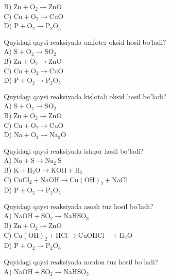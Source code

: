 B) $\mathrm{Zn}+\mathrm{O}_{2} \rightarrow \mathrm{ZnO}$\\
C) $\mathrm{Cu}+\mathrm{O}_{2} \rightarrow \mathrm{CuO}$\\
D) $\mathrm{P}+\mathrm{O}_{2} \rightarrow \mathrm{P}_{2} \mathrm{O}_{5}$
  \item Quyidagi qaysi reaksiyada amfoter oksid hosil bo'ladi?\\
A) $\mathrm{S}+\mathrm{O}_{2} \rightarrow \mathrm{SO}_{2}$\\
B) $\mathrm{Zn}+\mathrm{O}_{2} \rightarrow \mathrm{ZnO}$\\
C) $\mathrm{Cu}+\mathrm{O}_{2} \rightarrow \mathrm{CuO}$\\
D) $\mathrm{P}+\mathrm{O}_{2} \rightarrow \mathrm{P}_{2} \mathrm{O}_{5}$
  \item Quyidagi qaysi reaksiyada kislotali oksid hosil bo'ladi?\\
A) $\mathrm{S}+\mathrm{O}_{2} \rightarrow \mathrm{SO}_{2}$\\
B) $\mathrm{Zn}+\mathrm{O}_{2} \rightarrow \mathrm{ZnO}$\\
C) $\mathrm{Cu}+\mathrm{O}_{2} \rightarrow \mathrm{CuO}$\\
D) $\mathrm{Na}+\mathrm{O}_{2} \rightarrow \mathrm{Na}_{2} \mathrm{O}$
  \item Quyidagi qaysi reaksiyada ishqor hosil bo'ladi?\\
A) $\mathrm{Na}+\mathrm{S} \rightarrow \mathrm{Na}_{2} \mathrm{~S}$\\
B) $\mathrm{K}+\mathrm{H}_{2} \mathrm{O} \rightarrow \mathrm{KOH}+\mathrm{H}_{2}$\\
C) $\mathrm{CuCl}_{2}+\mathrm{NaOH} \rightarrow \mathrm{Cu}(\mathrm{OH})_{2}+\mathrm{NaCl}$\\
D) $\mathrm{P}+\mathrm{O}_{2} \rightarrow \mathrm{P}_{2} \mathrm{O}_{5}$
  \item Quyidagi qaysi reaksiyada asosli tuz hosil bo'ladi?\\
A) $\mathrm{NaOH}+\mathrm{SO}_{2} \rightarrow \mathrm{NaHSO}_{3}$\\
B) $\mathrm{Zn}+\mathrm{O}_{2} \rightarrow \mathrm{ZnO}$\\
C) $\mathrm{Cu}(\mathrm{OH})_{2}+\mathrm{HCl} \rightarrow \mathrm{CuOHCl} \quad+\mathrm{H}_{2} \mathrm{O}$\\
D) $\mathrm{P}+\mathrm{O}_{2} \rightarrow \mathrm{P}_{2} \mathrm{O}_{6}$
  \item Quyidagi qaysi reaksiyada nordon tuz hosil bo'ladi?\\
A) $\mathrm{NaOH}+\mathrm{SO}_{2} \rightarrow \mathrm{NaHSO}_{3}$\\
